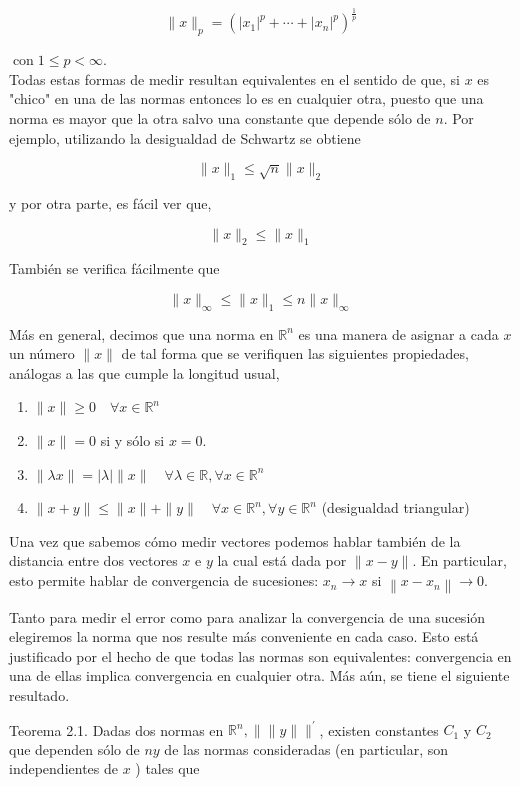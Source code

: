 \documentclass[10pt]{article}
\begin{document}
$$
\|x\|_{p}=\left(\left|x_{1}\right|^{p}+\cdots+\left|x_{n}\right|^{p}\right)^{\frac{1}{p}}
$$

$\operatorname{con} 1 \leq p<\infty$.\\
Todas estas formas de medir resultan equivalentes en el sentido de que, si $x$ es "chico" en una de las normas entonces lo es en cualquier otra, puesto que una norma es mayor que la otra salvo una constante que depende sólo de $n$. Por ejemplo, utilizando la desigualdad de Schwartz se obtiene

$$
\|x\|_{1} \leq \sqrt{n}\|x\|_{2}
$$

y por otra parte, es fácil ver que,

$$
\|x\|_{2} \leq\|x\|_{1}
$$

También se verifica fácilmente que

$$
\|x\|_{\infty} \leq\|x\|_{1} \leq n\|x\|_{\infty}
$$

Más en general, decimos que una norma en $\mathbb{R}^{n}$ es una manera de asignar a cada $x$ un número $\|x\|$ de tal forma que se verifiquen las siguientes propiedades, análogas a las que cumple la longitud usual,

\begin{enumerate}
  \item $\|x\| \geq 0 \quad \forall x \in \mathbb{R}^{n}$
  \item $\|x\|=0$ si y sólo si $x=0$.
  \item $\|\lambda x\|=|\lambda|\|x\| \quad \forall \lambda \in \mathbb{R}, \forall x \in \mathbb{R}^{n}$
  \item $\|x+y\| \leq\|x\|+\|y\| \quad \forall x \in \mathbb{R}^{n}, \forall y \in \mathbb{R}^{n}$ (desigualdad triangular)
\end{enumerate}

Una vez que sabemos cómo medir vectores podemos hablar también de la distancia entre dos vectores $x$ e $y$ la cual está dada por $\|x-y\|$. En particular, esto permite hablar de convergencia de sucesiones: $x_{n} \rightarrow x$ si $\left\|x-x_{n}\right\| \rightarrow 0$.

Tanto para medir el error como para analizar la convergencia de una sucesión elegiremos la norma que nos resulte más conveniente en cada caso. Esto está justificado por el hecho de que todas las normas son equivalentes: convergencia en una de ellas implica convergencia en cualquier otra. Más aún, se tiene el siguiente resultado.

Teorema 2.1. Dadas dos normas en $\mathbb{R}^{n},\| \| y\| \|^{\prime}$, existen constantes $C_{1}$ y $C_{2}$ que dependen sólo de $n y$ de las normas consideradas (en particular, son independientes de $x$ ) tales que
\end{document}
